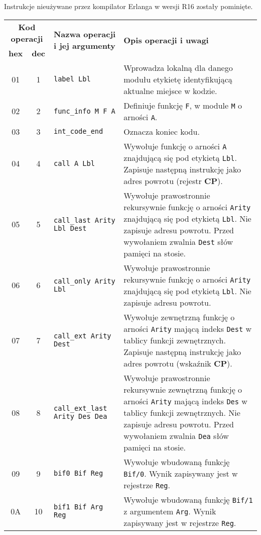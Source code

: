 Instrukcje nieużywane przez kompilator Erlanga w wersji R16 zostały pominięte.

\begin{longtable}{|c|c|p{5cm}|p{7cm}|}
\hline

\multicolumn{2}{|c|}{\textbf{Kod operacji}} & \multirow{2}{*}{\textbf{Nazwa operacji i jej argumenty}} & \multirow{2}{*}{\textbf{Opis operacji i uwagi}} \\
\cline{1-2}
\textbf{hex} & \textbf{dec} & & \\
\hline
\endfirsthead

01 & 1 & \texttt{label Lbl} & Wprowadza lokalną dla danego modułu etykietę identyfikującą aktualne miejsce w kodzie. \\
\hline
02 & 2 & \texttt{func\_info M F A} & Definiuje funkcję \texttt{F}, w module \texttt{M} o arności \texttt{A}. \\
\hline
03 & 3 & \texttt{int\_code\_end} & Oznacza koniec kodu.  \\
\hline
04 & 4 & \texttt{call A Lbl} & Wywołuje funkcję o arności \texttt{A} znajdującą się pod etykietą \texttt{Lbl}. Zapisuje następną instrukcję jako adres powrotu (rejestr \textbf{CP}). \\
\hline
05 & 5 & \texttt{call\_last Arity Lbl Dest} & Wywołuje prawostronnie rekursywnie funkcję o arności \texttt{Arity} znajdującą się pod etykietą \texttt{Lbl}. Nie zapisuje adresu powrotu. Przed wywołaniem zwalnia \texttt{Dest} słów pamięci na stosie.\\
\hline
06 & 6 & \texttt{call\_only Arity Lbl} & Wywołuje prawostronnie rekursywnie funkcję o arności \texttt{Arity} znajdującą się pod etykietą \texttt{Lbl}. Nie zapisuje adresu powrotu. \\
\hline
07 & 7 & \texttt{call\_ext Arity Dest} & Wywołuje zewnętrzną funkcję o arności \texttt{Arity} mającą indeks \texttt{Dest} w tablicy funkcji zewnętrznych. Zapisuje następną instrukcję jako adres powrotu (wskaźnik \textbf{CP}). \\
\hline
08 & 8 & \texttt{call\_ext\_last Arity Des Dea} & Wywołuje prawostronnie rekursywnie zewnętrzną funkcję o arności \texttt{Arity} mającą indeks \texttt{Des} w tablicy funkcji zewnętrznych. Nie zapisuje adresu powrotu. Przed wywołaniem zwalnia \texttt{Dea} słów pamięci na stosie.\\
\hline
09 & 9 & \texttt{bif0 Bif Reg} & Wywołuje wbudowaną funkcję \texttt{Bif/0}. Wynik zapisywany jest w rejestrze \texttt{Reg}. \\
\hline
0A & 10 & \texttt{bif1 Bif Arg Reg} & Wywołuje wbudowaną funkcję \texttt{Bif/1} z argumentem \texttt{Arg}. Wynik zapisywany jest w rejestrze \texttt{Reg}. \\

\end{longtable}
